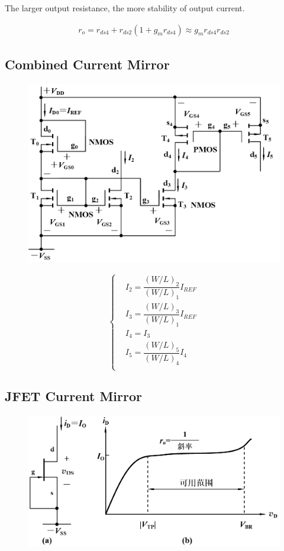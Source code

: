 The larger output resistance, the more stability of output current.

\begin{equation*}
  \begin{aligned}
    r_o = r_{ds4} + r_{ds2} \left( 1 + g_m r_{ds4} \right) \approx g_m r_{ds4} r_{ds2}
  \end{aligned}
\end{equation*}

\subsection{Combined Current Mirror}

\begin{figure}[H]
  \centering
  \includegraphics[width=0.6\linewidth]{figures/Combined-Current-Source}
  \label{fig:}
\end{figure}

\begin{equation*}
  \left\{
    \begin{aligned}
      & I_2 = \dfrac{\left( W / L \right)_2}{\left( W / L \right)_1} I_{REF} \\
      & I_3 = \dfrac{\left( W / L \right)_3}{\left( W / L \right)_1} I_{REF} \\
      & I_4 = I_3 \\
      & I_5 = \dfrac{\left( W / L \right)_5}{\left( W / L \right)_4} I_4 \\
    \end{aligned}
  \right.
\end{equation*}

\subsection{JFET Current Mirror}

\begin{figure}[H]
  \centering
  \includegraphics[width=0.7\linewidth]{figures/JFET-Current-Source}
  \label{fig:}
\end{figure}

